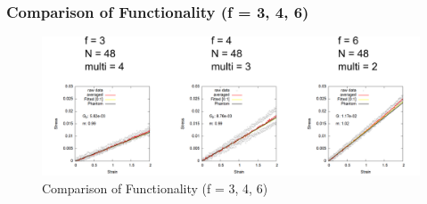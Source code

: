 \documentclass[12pt, dvipdfmx]{beamer}
\begin{document}
\begin{frame}
	\frametitle{
		Comparison of Functionality (f = 3, 4, 6)
	}

	\begin{figure}[htb]
		\centering
			\includegraphics[width=.9\textwidth]{compare_346.png}
			\caption{Comparison of Functionality (f = 3, 4, 6)}
			\label{N48_f346}
	\end{figure}

\end{frame}
\end{document}
